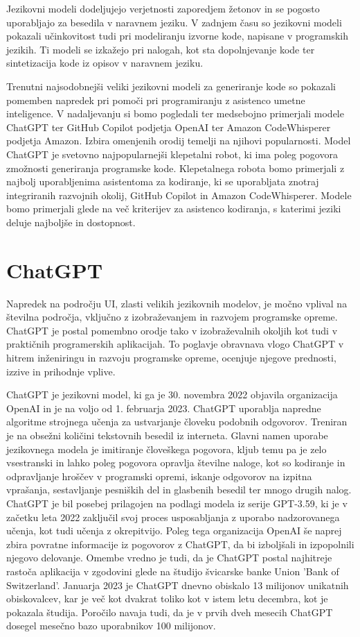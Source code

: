 \documentclass[a4paper,12pt,openright]{book}
\begin{document}
Jezikovni modeli dodeljujejo verjetnosti zaporedjem žetonov in se pogosto uporabljajo za besedila v naravnem jeziku. V zadnjem času so jezikovni modeli pokazali učinkovitost tudi pri modeliranju izvorne kode, napisane v programskih jezikih. Ti modeli se izkažejo pri nalogah, kot sta dopolnjevanje kode ter sintetizacija kode iz opisov v naravnem jeziku.


Trenutni najsodobnejši veliki jezikovni modeli za generiranje kode so pokazali pomemben napredek pri pomoči pri programiranju z asistenco umetne inteligence. V nadaljevanju si bomo pogledali ter medsebojno primerjali modele ChatGPT ter GitHub Copilot podjetja OpenAI ter Amazon CodeWhisperer podjetja Amazon.
\cite{KASNECI2023102274}
\cite{vaswani2023attention}
Izbira omenjenih orodij temelji na njihovi popularnosti. Model ChatGPT je svetovno najpopularnejši klepetalni robot, ki ima poleg pogovora zmožnosti generiranja programske kode. Klepetalnega robota bomo primerjali z najbolj uporabljenima asistentoma za kodiranje, ki se uporabljata znotraj integriranih razvojnih okolij, GitHub Copilot in Amazon CodeWhisperer. Modele bomo primerjali glede na več kriterijev za asistenco kodiranja, s katerimi jeziki deluje najboljše in dostopnost.

\section{ChatGPT}
Napredek na področju UI, zlasti velikih jezikovnih modelov, je močno vplival na številna področja, vključno z izobraževanjem in razvojem programske opreme. ChatGPT je postal pomembno orodje tako v izobraževalnih okoljih kot tudi v praktičnih programerskih aplikacijah. To poglavje obravnava vlogo ChatGPT v hitrem inženiringu in razvoju programske opreme, ocenjuje njegove prednosti, izzive in prihodnje vplive.

ChatGPT je jezikovni model, ki ga je 30. novembra 2022 objavila organizacija OpenAI in je na voljo od 1. februarja 2023. \cite{openai_codex}
ChatGPT uporablja napredne algoritme strojnega učenja za ustvarjanje človeku podobnih odgovorov. Treniran je na obsežni količini tekstovnih besedil iz interneta. Glavni namen uporabe jezikovnega modela je imitiranje človeškega pogovora, kljub temu pa je zelo vsestranski in lahko poleg pogovora opravlja številne naloge, kot so kodiranje in odpravljanje hroščev v programski opremi, iskanje odgovorov na izpitna vprašanja, sestavljanje pesniških del in glasbenih besedil ter mnogo drugih nalog. ChatGPT je bil posebej prilagojen na podlagi modela iz serije GPT-3.59, ki je v začetku leta 2022 zaključil svoj proces usposabljanja z uporabo nadzorovanega učenja, kot tudi učenja z okrepitvijo. Poleg tega organizacija OpenAI še naprej zbira povratne informacije iz pogovorov z ChatGPT, da bi izboljšali in izpopolnili njegovo delovanje. Omembe vredno je tudi, da je ChatGPT postal najhitreje rastoča aplikacija v zgodovini glede na študijo švicarske banke Union 'Bank of Switzerland'. Januarja 2023 je ChatGPT dnevno obiskalo 13 milijonov unikatnih obiskovalcev, kar je več kot dvakrat toliko kot v istem letu decembra, kot je pokazala študija. Poročilo navaja tudi, da je v prvih dveh mesecih ChatGPT dosegel mesečno bazo uporabnikov 100 milijonov. \cite{yetistiren2023evaluating}
\end{document}
